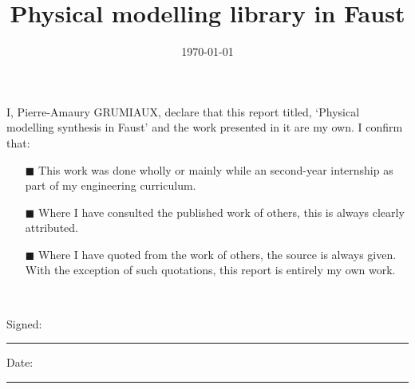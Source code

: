 \documentclass[a4paper, 11pt, oneside]{Thesis}  %
\begin{document}
\frontmatter      %

\title  {Physical modelling library in Faust}
\addresses  {\groupname\\\deptname\\\univname}  %
\date       {\today}
\subject    {}
\keywords   {}

\maketitle


\fancyhead{}  %
\rhead{\thepage}  %
\lhead{}  %

\pagestyle{fancy}  %

\Declaration
{


I, Pierre-Amaury GRUMIAUX, declare that this report titled, `Physical modelling synthesis in Faust' and the work presented in it are my own. I confirm that:

\begin{itemize} 
\item[\tiny{$\blacksquare$}] This work was done wholly or mainly while an second-year internship as part of my engineering curriculum.
 
\item[\tiny{$\blacksquare$}] Where I have consulted the published work of others, this is always clearly attributed.
 
\item[\tiny{$\blacksquare$}] Where I have quoted from the work of others, the source is always given. With the exception of such quotations, this report is entirely my own work.
 
\\
\end{itemize}
 
 
Signed:\\
\rule[1em]{25em}{0.5pt}  %
 
Date:\\
\rule[1em]{25em}{0.5pt}  %
}
\clearpage  %
\end{document}
